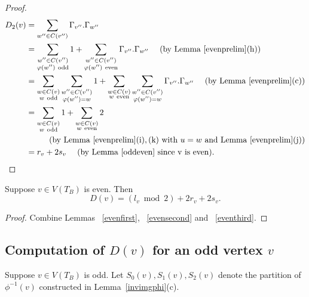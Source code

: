 \begin{proof}
  \begin{align*}
 D_2(v) &= \sum_{w'' \in C(v'')} \Gamma_{v''}.\Gamma_{w''} \\
 &= {\sum_{\substack{w'' \in C(v'') \\ \phi(w'') \ \mathrm{odd}}} 1} + {\sum_{\substack{w'' \in C(v'') \\ \phi(w'') \ \mathrm{even}}} \Gamma_{v''}.\Gamma_{w''}} \ \ \ \ (\mathrm{by \ Lemma~\ref{evenprelim}(h)}) \\
 &= {\sum_{\substack{w \in C(v) \\ w \ \mathrm{odd}}} \sum_{\substack{w'' \in C(v'') \\ \phi(w'') = w}} 1} + {\sum_{\substack{w \in C(v) \\ w \ \mathrm{even}}} \sum_{\substack{w'' \in C(v'') \\ \phi(w'') = w}} \Gamma_{v''}.\Gamma_{w''}} \ \ \ \ (\mathrm{by \ Lemma~\ref{evenprelim}(c)}) \\
 &= {\sum_{\substack{w \in C(v) \\ w \ \mathrm{odd}}} 1} + {\sum_{\substack{w \in C(v) \\ w \ \mathrm{even}}} 2} \\
 & \pushright{(\mathrm{by \ Lemma~\ref{evenprelim}(i),(k) \ with }\ u=w \ \mathrm{and \ Lemma~\ref{evenprelim}(j)})}\\
 &= r_v + 2s_v \ \ \ \ (\mathrm{by \ Lemma~\ref{oddeven} \ since \ v \ is \ even}). \qedhere
\end{align*}    
\end{proof}

\begin{lemma}\label{eventotal}
 Suppose $v \in V(T_B)$ is even. Then
 \[ D(v) = (l_v \bmod 2)+2r_v+2s_v .\]
\end{lemma}
\begin{proof}
Combine Lemmas ~\ref{evenfirst}, ~\ref{evensecond} and ~\ref{eventhird}.
\end{proof}

\subsection{Computation of $D(v)$ for an odd vertex $v$}
Suppose $v \in V(T_B)$ is odd. Let $S_0(v),S_1(v),S_2(v)$ denote the partition of $\phi^{-1}(v)$ constructed in Lemma~\ref{invimgphi}(c). 

